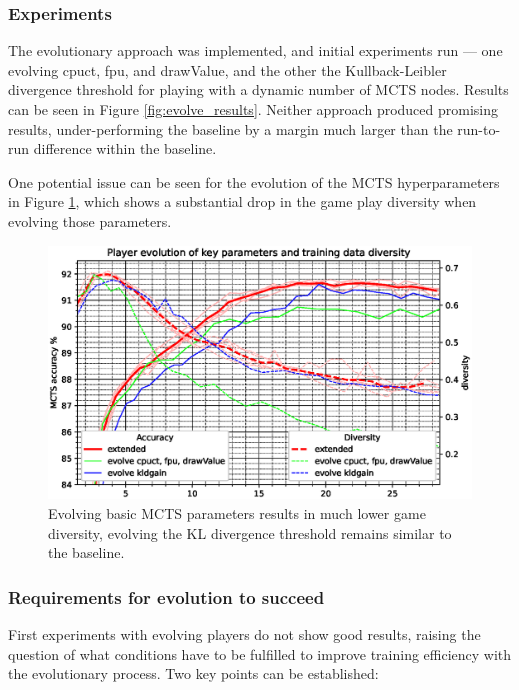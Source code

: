 \documentclass[12pt,onecolumn,oneside,titlepage]{article}
\begin{document}
\subsubsection{Experiments}

The evolutionary approach was implemented, and initial experiments run --- one evolving cpuct, fpu, and drawValue, and the other the Kullback-Leibler divergence threshold for playing with a dynamic number of MCTS nodes.
Results can be seen in Figure \ref{fig:evolve_results}. Neither approach produced promising results, under-performing the baseline by a margin much larger than the run-to-run difference within the baseline.


One potential issue can be seen for the evolution of the MCTS hyperparameters in Figure \ref{fig:evolve_low_diversity}, which shows a substantial drop in the game play diversity when evolving those parameters.

\begin{figure}[H]
\centering
\includegraphics[clip,width=\columnwidth]{evolve_low_diversity}
\caption{Evolving basic MCTS parameters results in much lower game diversity, evolving the KL divergence threshold remains similar to the baseline. }
\label{fig:evolve_low_diversity}
\end{figure}

\subsubsection{Requirements for evolution to succeed}

First experiments with evolving players do not show good results, raising the question of what conditions have to be fulfilled to improve training efficiency with the evolutionary process.
Two key points can be established:
\end{document}
